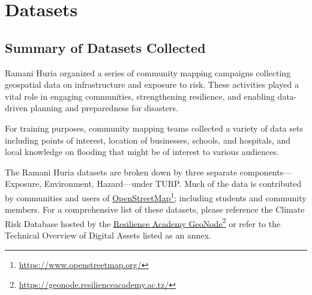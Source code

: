\documentclass[a4paper,12pt,twoside]{article}
\begin{document}
\newpage
\section{Datasets}

\subsection{Summary of Datasets Collected}
\begin{multicols}{2}

Ramani Huria organized a series of community mapping campaigns collecting geospatial data on infrastructure and exposure to risk. These activities played a vital role in engaging communities, strengthening resilience, and enabling data-driven planning and preparedness for disasters. 

For training purposes, community mapping teams collected a variety of data sets including points of interest, location of businesses, schools, and hospitals,  and local knowledge on flooding that might be of interest to various audiences.

The Ramani Huria datasets are broken down by three separate components—Exposure, Environment, Hazard—under TURP. Much of the data is contributed by communities and users of \href{https://www.openstreetmap.org/}{OpenStreetMap}\footnote{\url{https://www.openstreetmap.org/}}; including students and community members. For a comprehensive list of these datasets, please reference the Climate Risk Database hosted by the \href{https://geonode.resilienceacademy.ac.tz/}{Resilience Academy GeoNode}\footnote{\url{https://geonode.resilienceacademy.ac.tz/}} or refer to the Technical Overview of Digital Assets listed as an annex.
\end{multicols}

\begin{figure}[h!]
	\centering
\end{figure}
\end{document}
